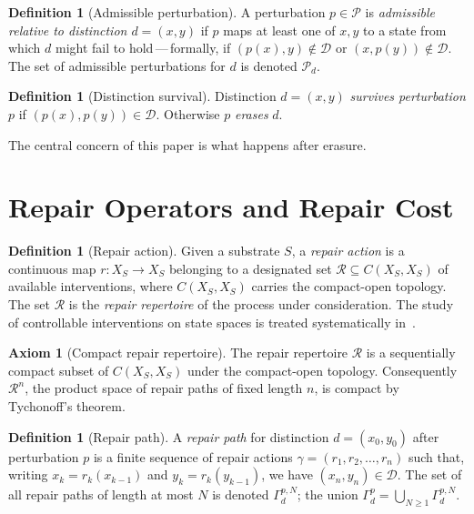 \documentclass[12pt, oneside]{article}
\theoremstyle{plain}
\theoremstyle{definition}
\newtheorem{definition}[theorem]{Definition}
\theoremstyle{remark}
\theoremstyle{definition}
\newtheorem{axiom}[theorem]{Axiom}
\newcommand{\Xsub}{X_S}
\newcommand{\Psub}{\mathcal{P}}
\newcommand{\Dsub}{\mathcal{D}}
\begin{document}
\begin{definition}[Admissible perturbation]
  A perturbation $p \in \Psub$ is \emph{admissible relative to
  distinction $d = (x,y)$} if $p$ maps at least one of $x, y$ to a
  state from which $d$ might fail to hold\,---\,formally, if
  $(p(x), y) \notin \Dsub$ or $(x, p(y)) \notin \Dsub$.
  The set of admissible perturbations for $d$ is denoted $\Psub_d$.
\end{definition}

\begin{definition}[Distinction survival]
  Distinction $d = (x,y)$ \emph{survives perturbation} $p$ if
  $(p(x), p(y)) \in \Dsub$.
  Otherwise $p$ \emph{erases} $d$.
\end{definition}

The central concern of this paper is what happens after erasure.


\section{Repair Operators and Repair Cost}
\label{sec:repair}

\begin{definition}[Repair action]
  Given a substrate $S$, a \emph{repair action} is a continuous map
  $r : \Xsub \to \Xsub$ belonging to a designated set
  $\mathcal{R} \subseteq C(\Xsub, \Xsub)$ of available interventions,
  where $C(\Xsub, \Xsub)$ carries the compact-open topology.
  The set $\mathcal{R}$ is the \emph{repair repertoire} of the process
  under consideration.
  The study of controllable interventions on state spaces is treated
  systematically in~\cite{Sontag1998,Kalman1960,Bellman1957}.
\end{definition}

\begin{axiom}[Compact repair repertoire]
  The repair repertoire $\mathcal{R}$ is a sequentially compact subset
  of $C(\Xsub, \Xsub)$ under the compact-open topology.
  Consequently $\mathcal{R}^n$, the product space of repair paths of
  fixed length $n$, is compact by Tychonoff's theorem.
  \label{ax:compact-r}
\end{axiom}

\begin{definition}[Repair path]
  A \emph{repair path} for distinction $d = (x_0, y_0)$ after
  perturbation $p$ is a finite sequence of repair actions
  $\gamma = (r_1, r_2, \ldots, r_n)$ such that, writing
  $x_k = r_k(x_{k-1})$ and $y_k = r_k(y_{k-1})$, we have
  $(x_n, y_n) \in \Dsub$.
  The set of all repair paths of length at most $N$ is denoted
  $\Gamma_d^{p,N}$; the union $\Gamma_d^p = \bigcup_{N \geq 1}
  \Gamma_d^{p,N}$.
\end{definition}
\end{document}
